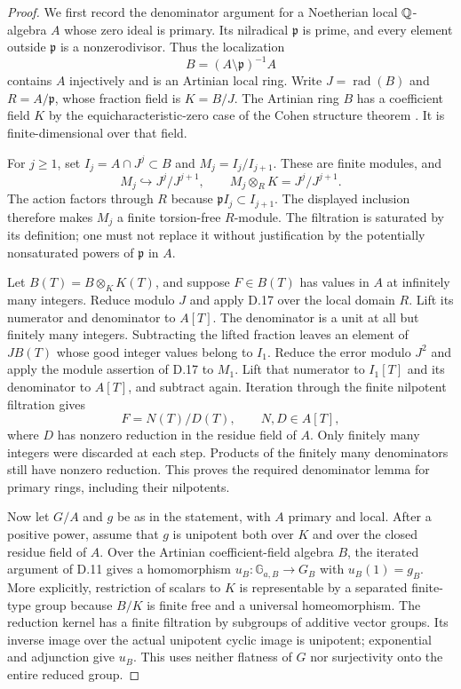 \begin{proof}
We first record the denominator argument for a Noetherian local
$\mathbb Q$-algebra $A$ whose zero ideal is primary. Its nilradical
$\mathfrak p$ is prime, and every element outside $\mathfrak p$
is a nonzerodivisor. Thus the localization
\[
 B=(A\setminus\mathfrak p)^{-1}A
\]
contains $A$ injectively and is an Artinian local ring. Write
$J=\operatorname{rad}(B)$ and $R=A/\mathfrak p$, whose fraction
field is $K=B/J$. The Artinian ring $B$ has a coefficient field
$K$ by the equicharacteristic-zero case of the Cohen structure
theorem \citep[Theorem 10.160.8, Tag 032A]{DS_StacksCohen}.
It is finite-dimensional over that field.

For $j\ge1$, set $I_j=A\cap J^j\subset B$ and
$M_j=I_j/I_{j+1}$. These are finite modules, and
\[
 M_j\hookrightarrow J^j/J^{j+1},\qquad
 M_j\otimes_R K=J^j/J^{j+1}.
\]
The action factors through $R$ because
$\mathfrak p I_j\subset I_{j+1}$. The displayed inclusion
therefore makes $M_j$ a finite torsion-free $R$-module. The
filtration is saturated by its definition; one must not replace
it without justification by the potentially nonsaturated powers
of $\mathfrak p$ in $A$.

Let $B(T)=B\otimes_K K(T)$, and suppose $F\in B(T)$ has
values in $A$ at infinitely many integers. Reduce modulo $J$
and apply D.17 over the local domain $R$. Lift its numerator
and denominator to $A[T]$. The denominator is a unit at all
but finitely many integers. Subtracting the lifted fraction
leaves an element of $J B(T)$ whose good integer values belong
to $I_1$. Reduce the error modulo $J^2$ and apply the module
assertion of D.17 to $M_1$. Lift that numerator to $I_1[T]$
and its denominator to $A[T]$, and subtract again. Iteration
through the finite nilpotent filtration gives
\[
              F=N(T)/D(T),\qquad N,D\in A[T],
\]
where $D$ has nonzero reduction in the residue field of $A$.
Only finitely many integers were discarded at each step.
Products of the finitely many denominators still have nonzero
reduction. This proves the required denominator lemma for
primary rings, including their nilpotents.

Now let $G/A$ and $g$ be as in the statement, with $A$ primary
and local. After a positive power, assume that $g$ is unipotent
both over $K$ and over the closed residue field of $A$.
Over the Artinian coefficient-field algebra $B$, the iterated
argument of D.11 gives a homomorphism
$u_B:\mathbb G_{a,B}\to G_B$ with $u_B(1)=g_B$.
More explicitly, restriction of scalars to $K$ is representable
by a separated finite-type group because $B/K$ is finite free
and a universal homeomorphism. The reduction kernel has a finite
filtration by subgroups of additive vector groups. Its inverse
image over the actual unipotent cyclic image is unipotent;
exponential and adjunction give $u_B$. This uses neither
flatness of $G$ nor surjectivity onto the entire reduced group.


\end{proof}
